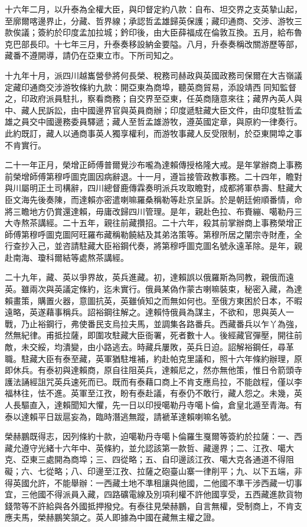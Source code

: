 \begin{pinyinscope}
十六年二月，以升泰為全權大臣，與印督定約八款：自布、坦交界之支英摯山起，至廓爾喀邊界止，分藏、哲界線；承認哲孟雄歸英保護；藏印通商、交涉、游牧三款俟議；簽約於印度孟加拉城；鈐印後，由大臣薛福成在倫敦互換。五月，給布魯克巴部長印。十七年三月，升泰奏移設納金要隘。八月，升泰奏稱改關游歷等部，藏番不遵開導，請仍在亞東立市。下所司知之。

十九年十月，派四川越巂營參將何長榮、稅務司赫政與英國政務司保爾在大吉嶺議定藏印通商交涉游牧條約九款：開亞東為商埠，聽英商貿易，添設靖西同知監督之，印政府派員駐扎，察看商務；自交界至亞東，任英商隨意來往；藏界內英人與中、藏人民訴訟，由中國邊界官與英員商辦；印度遞駐藏大臣文件，由印度駐哲孟雄之員交中國邊務委員驛遞；藏人至哲孟雄游牧，遵英國定章，與原約一律奏行。此約既訂，藏人以通商事英人獨享權利，而游牧事藏人反受限制，於亞東開埠之事不肯實行。

二十一年正月，榮增正師傅普爾覺沙布嚨為達賴傳授格隆大戒。是年掌辦商上事務前榮增師傅第穆呼圖克圖因病辭退。十一月，遵旨接管政教事務。二十四年，瞻對與川屬明正土司構辭，四川總督鹿傳霖奏明派兵攻取瞻對，成都將軍恭壽、駐藏大臣文海先後奏陳，而達賴亦密遣喇嘛羅桑稱勒等赴京呈訴。於是朝廷俯順番情，命將三瞻地方仍賞還達賴，毋庸改歸四川管理。是年，親赴色拉、布賚繃、噶勒丹三大寺熬茶講經。二十五年，親往前藏攢招。二十六年，殺其前掌辦商上事務榮增正師傅第穆呼圖克圖阿旺羅布藏稱勒饒結及其弟洛策等。第穆所居之闡宗寺財產，全行查抄入己，並咨請駐藏大臣裕鋼代奏，將第穆呼圖克圖名號永遠革除。是年，親赴南海、瓊科爾結等處熬茶講經。

二十九年，藏、英以爭界故，英兵進藏。初，達賴誤以俄羅斯為同教，親俄而遠英。雖兩次與英議定條約，迄未實行。俄員某偽作蒙古喇嘛裝束，秘密入藏，為達賴畫策，購置火器，意圖抗英，英雖偵知之而無如何也。至俄方東困於日本，不暇遠略，英遂藉事稱兵。詔裕鋼往解之。達賴恃俄員為謀主，不欲和，思與英人一戰，乃止裕鋼行，弗使番民支烏拉夫馬，並調集各路番兵。西藏番兵以乍丫為強，然無紀律。甫抵拉薩，即圍攻駐藏大臣衙署，死者數十人。後經藏官彈壓，開往前敵，未交綏，均潰變，由小路逃去。時藏兵屢敗，英兵日迫。詔解裕鋼任，尋革職。駐藏大臣有泰至藏，英軍猶駐堆補，約赴帕克里議和，照十六年條約辦理，原即休兵。有泰初與達賴商，原自往阻英兵，達賴尼之，然亦無他策，惟日令箭頭寺護法誦經詛咒英兵速死而已。既而有泰藉口商上不肯支應烏拉，不能啟程，僅以李福林往，怯不進。英軍至江孜，盼有泰赴議，有泰仍不敢行，藏人怨之。未幾，英人長驅直入，達賴聞知大懼，先一日以印授噶勒丹寺噶卜倫，倉皇北遁至青海。有泰以達賴平日跋扈妄為，臨時潛逃無蹤，請褫革達賴喇嘛名號。

榮赫鵬既得志，因列條約十款，迫噶勒丹寺噶卜倫羅生戛爾等簽約於拉薩：一、西藏允遵守光緒十六年中、英條約，並允認該第一款哲、藏邊界；二、江孜、噶大克、亞東三處開為商埠；三、四從略；五、自印邊該江孜、噶大克各通道不得阻礙；六、七從略；八、印邊至江孜、拉薩之砲臺山寨一律削平；九、以下五端，非得英國允許，不能舉辦：一西藏土地不準租讓與他國，二他國不準干涉西藏一切事宜，三他國不得派員入藏，四路礦電線及別項利權不許他國享受，五西藏進款貨物錢幣等不許給與各外國抵押撥兌。有泰往見榮赫鵬，自言無權，受制商上，不肯支應夫馬，榮赫鵬笑頷之。英人即據為中國在藏無主權之證。


\end{pinyinscope}
